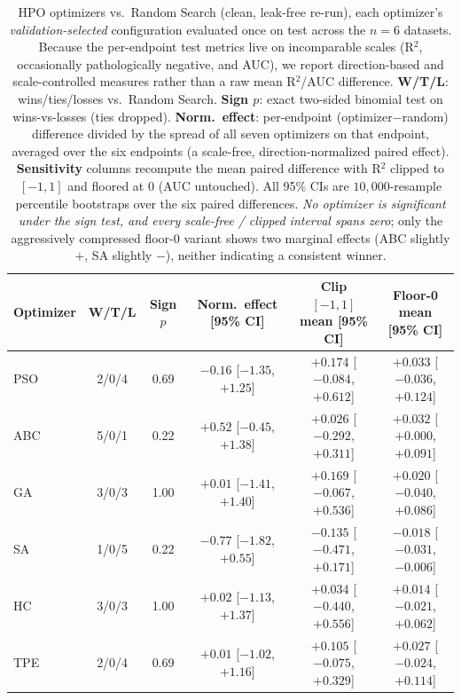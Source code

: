 \documentclass[journal]{IEEEtran}
\begin{document}
\begin{table}[!t]
\centering
\caption{HPO optimizers vs.\ Random Search (clean, leak-free re-run), each optimizer's \emph{validation-selected} configuration evaluated once on test across the $n=6$ datasets. Because the per-endpoint test metrics live on incomparable scales (R$^2$, occasionally pathologically negative, and AUC), we report direction-based and scale-controlled measures rather than a raw mean R$^2$/AUC difference. \textbf{W/T/L}: wins/ties/losses vs.\ Random Search. \textbf{Sign $p$}: exact two-sided binomial test on wins-vs-losses (ties dropped). \textbf{Norm.\ effect}: per-endpoint (optimizer$-$random) difference divided by the spread of all seven optimizers on that endpoint, averaged over the six endpoints (a scale-free, direction-normalized paired effect). \textbf{Sensitivity} columns recompute the mean paired difference with R$^2$ clipped to $[-1,1]$ and floored at $0$ (AUC untouched). All 95\% CIs are $10{,}000$-resample percentile bootstraps over the six paired differences. \emph{No optimizer is significant under the sign test, and every scale-free / clipped interval spans zero}; only the aggressively compressed floor-$0$ variant shows two marginal effects (ABC slightly $+$, SA slightly $-$), neither indicating a consistent winner.}
\label{tab:best_results}
\small
\setlength{\tabcolsep}{4pt}
\begin{tabular}{lccccc}
\toprule
\textbf{Optimizer} & \textbf{W/T/L} & \textbf{Sign $p$} & \textbf{Norm.\ effect [95\% CI]} & \textbf{Clip $[-1,1]$ mean [95\% CI]} & \textbf{Floor-0 mean [95\% CI]} \\
\midrule
PSO & 2/0/4 & 0.69 & $-0.16$ [$-1.35$, $+1.25$] & $+0.174$ [$-0.084$, $+0.612$] & $+0.033$ [$-0.036$, $+0.124$] \\
ABC & 5/0/1 & 0.22 & $+0.52$ [$-0.45$, $+1.38$] & $+0.026$ [$-0.292$, $+0.311$] & $+0.032$ [$+0.000$, $+0.091$] \\
GA  & 3/0/3 & 1.00 & $+0.01$ [$-1.41$, $+1.40$] & $+0.169$ [$-0.067$, $+0.536$] & $+0.020$ [$-0.040$, $+0.086$] \\
SA  & 1/0/5 & 0.22 & $-0.77$ [$-1.82$, $+0.55$] & $-0.135$ [$-0.471$, $+0.171$] & $-0.018$ [$-0.031$, $-0.006$] \\
HC  & 3/0/3 & 1.00 & $+0.02$ [$-1.13$, $+1.37$] & $+0.034$ [$-0.440$, $+0.556$] & $+0.014$ [$-0.021$, $+0.062$] \\
TPE & 2/0/4 & 0.69 & $+0.01$ [$-1.02$, $+1.16$] & $+0.105$ [$-0.075$, $+0.329$] & $+0.027$ [$-0.024$, $+0.114$] \\
\bottomrule
\end{tabular}
\end{table}
\end{document}
